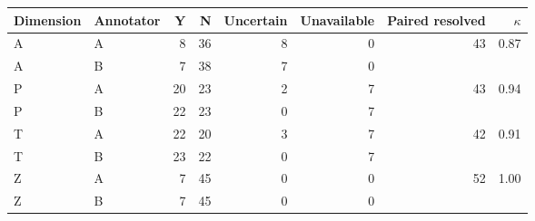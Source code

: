 \begin{tabular}{llrrrrrr}
\toprule
Dimension & Annotator & Y & N & Uncertain & Unavailable & Paired resolved & $\kappa$\\
\midrule
A & A & 8 & 36 & 8 & 0 & 43 & 0.87\\
A & B & 7 & 38 & 7 & 0 &  & \\
P & A & 20 & 23 & 2 & 7 & 43 & 0.94\\
P & B & 22 & 23 & 0 & 7 &  & \\
T & A & 22 & 20 & 3 & 7 & 42 & 0.91\\
T & B & 23 & 22 & 0 & 7 &  & \\
Z & A & 7 & 45 & 0 & 0 & 52 & 1.00\\
Z & B & 7 & 45 & 0 & 0 &  & \\
\bottomrule
\end{tabular}

